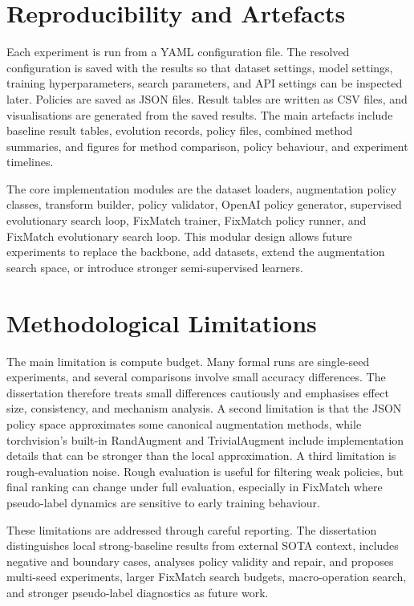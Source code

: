 \documentclass[12pt,a4paper]{report}
\begin{document}
\section{Reproducibility and Artefacts}

Each experiment is run from a YAML configuration file. The resolved configuration is saved with the results so that dataset settings, model settings, training hyperparameters, search parameters, and API settings can be inspected later. Policies are saved as JSON files. Result tables are written as CSV files, and visualisations are generated from the saved results. The main artefacts include baseline result tables, evolution records, policy files, combined method summaries, and figures for method comparison, policy behaviour, and experiment timelines.

The core implementation modules are the dataset loaders, augmentation policy classes, transform builder, policy validator, OpenAI policy generator, supervised evolutionary search loop, FixMatch trainer, FixMatch policy runner, and FixMatch evolutionary search loop. This modular design allows future experiments to replace the backbone, add datasets, extend the augmentation search space, or introduce stronger semi-supervised learners.

\section{Methodological Limitations}

The main limitation is compute budget. Many formal runs are single-seed experiments, and several comparisons involve small accuracy differences. The dissertation therefore treats small differences cautiously and emphasises effect size, consistency, and mechanism analysis. A second limitation is that the JSON policy space approximates some canonical augmentation methods, while torchvision's built-in RandAugment and TrivialAugment include implementation details that can be stronger than the local approximation. A third limitation is rough-evaluation noise. Rough evaluation is useful for filtering weak policies, but final ranking can change under full evaluation, especially in FixMatch where pseudo-label dynamics are sensitive to early training behaviour.

These limitations are addressed through careful reporting. The dissertation distinguishes local strong-baseline results from external SOTA context, includes negative and boundary cases, analyses policy validity and repair, and proposes multi-seed experiments, larger FixMatch search budgets, macro-operation search, and stronger pseudo-label diagnostics as future work.



\end{document}
